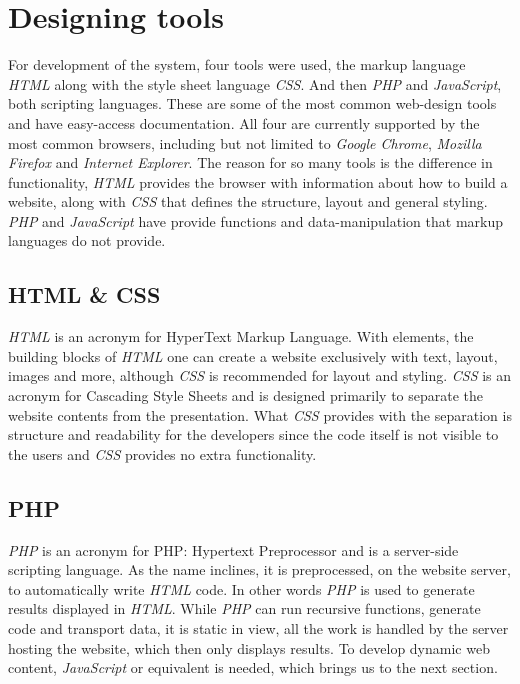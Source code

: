 \section{Designing tools}
For development of the system, four tools were used, the markup language \textit{HTML} along with the style sheet language \textit{CSS}. And then \textit{PHP} and \textit{JavaScript}, both scripting languages. These are some of the most common web-design tools and have easy-access documentation. All four are currently supported by the most common browsers, including but not limited to \textit{Google Chrome}, \textit{Mozilla Firefox} and \textit{Internet Explorer}.
The reason for so many tools is the difference in functionality, \textit{HTML} provides the browser with information about how to build a website, along with \textit{CSS} that defines the structure, layout and general styling. \textit{PHP} and \textit{JavaScript} have provide functions and data-manipulation that markup languages do not provide.
\cite{html}\cite{css}\cite{php}\cite{javascript}

\subsection{HTML \& CSS}
\textit{HTML} is an acronym for HyperText Markup Language. With elements, the building blocks of \textit{HTML} one can create a website exclusively with text, layout, images and more, although \textit{CSS} is recommended for layout and styling. \textit{CSS} is an acronym for Cascading Style Sheets and is designed primarily to separate the website contents from the presentation.
What \textit{CSS} provides with the separation is structure and readability for the developers since the code itself is not visible to the users and \textit{CSS} provides no extra functionality.\cite{html}\cite{css}

\subsection{PHP}
\textit{PHP} is an acronym for PHP: Hypertext Preprocessor and is a server-side scripting language. As the name inclines, it is preprocessed, on the website server, to automatically write \textit{HTML} code. In other words \textit{PHP} is used to generate results displayed in \textit{HTML}. While \textit{PHP} can run recursive functions, generate code and transport data, it is static in view, all the work is handled by the server hosting the website, which then only displays results. To develop dynamic web content, \textit{JavaScript} or equivalent is needed, which brings us to the next section.\cite{php}

